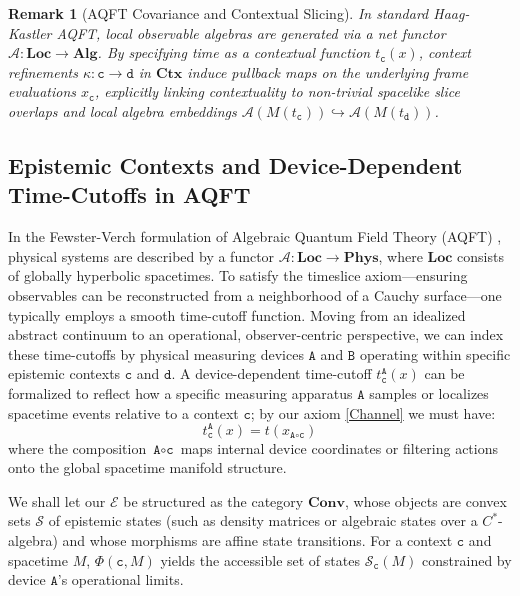 \documentclass{article}
\newtheorem{rk}{Remark}
\numberwithin{tm}{section}
\numberwithin{dn}{section}
\numberwithin{as}{section}
\numberwithin{rk}{section}
\numberwithin{lem}{section}
\numberwithin{ax}{section}
\numberwithin{pp}{section}
\numberwithin{eg}{section}
\numberwithin{war}{section}
\numberwithin{equation}{section}
\numberwithin{prop}{section}
\numberwithin{nt}{section}
\numberwithin{rc}{section}
\def\code#1{\texttt{#1}}
\begin{document}
\begin{rk}[AQFT Covariance and Contextual Slicing]
	In standard Haag-Kastler AQFT, local observable algebras are generated via a net functor $\mathcal{A}: \mathbf{Loc} \to \mathbf{Alg}$. By specifying time as a contextual function $t_{\code{c}}(x)$, context refinements $\kappa: \code{c} \to \code{d}$ in $\mathbf{Ctx}$ induce pullback maps on the underlying frame evaluations $x_{\code{c}}$, explicitly linking contextuality to non-trivial spacelike slice overlaps and local algebra embeddings $\mathcal{A}(M(t_{\code{c}})) \hookrightarrow \mathcal{A}(M(t_{\code{d}}))$.
\end{rk}

\subsection{Epistemic Contexts and Device-Dependent Time-Cutoffs in AQFT}

In the Fewster-Verch formulation of Algebraic Quantum Field Theory (AQFT) \cite{fewster2012, fewster2013}, physical systems are described by a functor $\mathcal{A} : \mathbf{Loc} \to \mathbf{Phys}$, where $\mathbf{Loc}$ consists of globally hyperbolic spacetimes. To satisfy the timeslice axiom—ensuring observables can be reconstructed from a neighborhood of a Cauchy surface—one typically employs a smooth time-cutoff function. Moving from an idealized abstract continuum to an operational, observer-centric perspective, we can index these time-cutoffs by physical measuring devices $\code{A}$ and $\code{B}$ operating within specific epistemic contexts $\code{c}$ and $\code{d}$. A device-dependent time-cutoff $t_{\code{c}}^{\code{A}}(x)$ can be formalized to reflect how a specific measuring apparatus $\code{A}$ samples or localizes spacetime events relative to a context $\code{c}$; by our axiom \eqref{Channel} we must have: $$t_{\code{c}}^{\code{A}}(x) = t(x_{\code{A} \circ \code{c}})$$ where the composition $\code{A} \circ \code{c}$ maps internal device coordinates or filtering actions onto the global spacetime manifold structure.

We shall let our $\mathcal{E}$ be structured as the category $\mathbf{Conv}$, whose objects are convex sets $\mathcal{S}$ of epistemic states (such as density matrices or algebraic states over a $C^*$-algebra) and whose morphisms are affine state transitions. For a context $\code{c}$ and spacetime $M$, $\Phi(\code{c}, M)$ yields the accessible set of states $\mathcal{S}_{\code{c}}(M)$ constrained by device $\code{A}$'s operational limits. 
\end{document}
